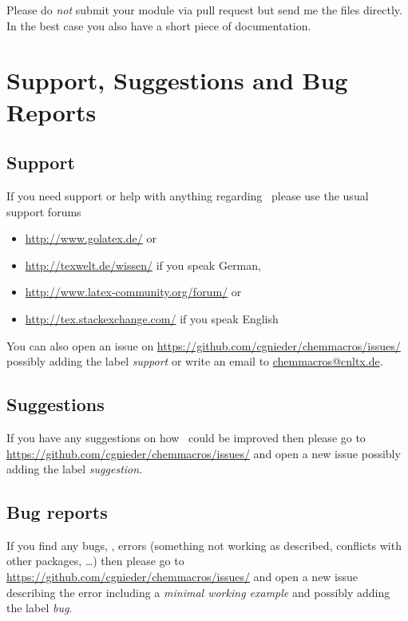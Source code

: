 \documentclass{chemmacros-manual}
\begin{document}
Please do \emph{not} submit your module via pull request but send me the files
directly.  In the best case you also have a short piece of documentation.

\section{Support, Suggestions and Bug Reports}\label{sec:sugg-bug-reports}

\subsection{Support}
If you need support or help with anything regarding \chemmacros\ please use
the usual support forums
\begin{itemize}
  \item \url{http://www.golatex.de/} or
  \item \url{http://texwelt.de/wissen/} if you speak German,
  \item \url{http://www.latex-community.org/forum/} or
  \item \url{http://tex.stackexchange.com/} if you speak English
\end{itemize}
You can also open an issue on
\url{https://github.com/cgnieder/chemmacros/issues/} possibly adding the label
\emph{support} or write an email to
\href{mailto:chemmacros@cnltx.de}{chemmacros@cnltx.de}.

\subsection{Suggestions}
If you have any suggestions on how \chemmacros\ could be improved then please
go to \url{https://github.com/cgnieder/chemmacros/issues/} and open a new
issue possibly adding the label \emph{suggestion}.

\subsection{Bug reports}
If you find any bugs, \ie, errors (something not working as described,
conflicts with other packages, \ldots) then please go to
\url{https://github.com/cgnieder/chemmacros/issues/} and open a new issue
describing the error including a \emph{minimal working example} and possibly
adding the label \emph{bug}.

\printbibliography
\end{document}
